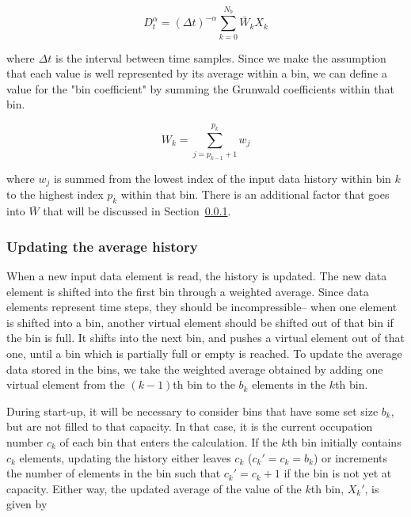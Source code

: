 \begin{equation}
D^\alpha_t = \displaystyle(\Delta t)^{-\alpha}\sum\limits_{k=0}^{N_b}\bar{W}_kX_k
\label{avgSimpleGrunwald}
\end{equation}

\noindent where $\Delta t$ is the interval between time samples. Since we make the assumption that each value is well represented by its average within a bin, we can define a value for the "bin coefficient" by summing the Grunwald coefficients within that bin. 

\begin{equation}
W_k = \displaystyle\sum\limits_{j=p_{k-1}+1}^{p_k} w_j
\label{sumWk}
\end{equation}

\noindent where $w_j$ is summed from the lowest index of the input data history within bin $k$ to the highest index $p_k$ within that bin. There is an additional factor that goes into $\bar{W}$ that will be discussed in Section~\ref{sec:shifting}.


\subsubsection{Updating the average history}
\label{sec:shifting}

When a new input data element is read, the history is updated. The new data element is shifted into the first bin through a weighted average. Since data elements represent time steps, they should be incompressible-- when one element is shifted into a bin, another virtual element should be shifted out of that bin if the bin is full. It shifts into the next bin, and pushes a virtual element out of that one, until a bin which is partially full or empty is reached. To update the average data stored in the bins, we take the weighted average obtained by adding one virtual element from the $(k-1)$th bin to the $b_k$ elements in the $k$th bin. 

During start-up, it will be necessary to consider bins that have some set size $b_k$, but are not filled to that capacity. In that case, it is the current occupation number $c_k$ of each bin that enters the calculation. If the $k$th bin initially contains $c_k$
elements, updating the history either leaves $c_k$ 
($c_k\prime=c_k=b_k$) or increments the number of elements in the bin such
that $c_k\prime = c_k + 1$ if the bin is not yet at capacity. Either way, the updated average of the
value of the $k$th bin, $X_k\prime$, is given by

